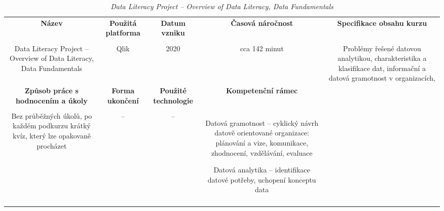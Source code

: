 \begin{landscape}

\begin{table}[htbp]

\renewcommand\thetable{3}

\caption{\textit{Data Literacy Project – Overview of Data Literacy, Data Fundamentals}}\label{tab3}

\footnotesize

{

\justifying

\begin{tabularx}{\linewidth}{CCCCC}

\toprule

\textbf{Název} &

\textbf{Použitá platforma} &

\textbf{Datum vzniku} &

\textbf{Časová náročnost} &
 
\textbf{Specifikace obsahu kurzu}

\\

\tabularnewline
\midrule

Data Literacy Project – Overview of Data Literacy, Data Fundamentals

&

Qlik

&

2020

&

cca 142 minut

&

Problémy řešené datovou analytikou, charakteristika a klasifikace dat, informační a datová gramotnost v organizacích, 

\\
\toprule

\textbf{Způsob práce s hodnocením a úkoly} &

\textbf{Forma ukončení} &

\textbf{Použité technologie} &

\textbf{Kompetenční rámec} 

\\

\tabularnewline
\midrule

Bez průběžných úkolů, po každém podkurzu krátký kvíz, který lze opakovaně procházet

&

–

&

–

&

Datová gramotnost – cyklický návrh datově orientované organizace: plánování a vize, komunikace, zhodnocení, vzdělávání, evaluace

Datová analytika – identifikace datové potřeby, uchopení konceptu data

\\

\tabularnewline
\bottomrule
\end{tabularx}

}

\end{table}

\end{landscape}